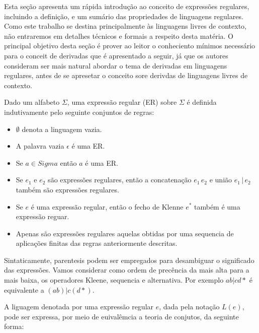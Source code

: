 Esta seção apresenta um rápida introdução ao conceito de expressões regulares, incluindo a definição, e um sumário das propriedades
de linguagens regulares. Como este trabalho se destina principalmente às linguagens livres de contexto, não entraremos em detalhes
técnicos e formais a respeito desta matéria. O principal objetivo desta seção é prover ao leitor o conheciento mínimos necessário para
o conceit de derivadas que é apresentado a seguir, já que os autores consideram ser mais natural abordar o tema de derivadas em linguagens
regulares, antes de se apresetar o conceito sore derivdas de linguagens livres de contexto.


Dado um alfabeto $\Sigma$, uma expressão regular (ER) sobre $\Sigma$ é definida indutivamente pelo seguinte conjuntos de regras:

\begin{itemize}
 \item $\emptyset$  denota a linguagem vazia.
 \item A palavra vazia $\epsilon$ é uma ER.
 \item Se $a\in Sigma$  então $a$ é uma ER.
 \item Se $e_1$ e $e_2$  são expressões regulares, então a concatenação $e_1\,e_2 $ e união $e_1\, |\,e_2$ também são expressões regulares.
 \item Se $e$ é uma expressão regular, então o fecho de Klenne $e^*$ também é uma expressão reguar.
 \item Apenas são expressões regulares aquelas obtidas por uma sequencia de aplicações finitas das regras anteriormente descritas.
\end{itemize}

 Sintaticamente, parentesis podem ser empregados para desambiguar o significado das expressões. Vamos considerar como ordem de precência
 da mais alta para a mais baixa, os operadores Kleene, sequencia e alternativa. Por exemplo $ab|cd*$ é equivalente a $(ab)|c(d*)$.

 A liguagem denotada por uma expressão regular $e$, dada pela notação $L(e)$, pode ser expressa, por meio de euivalêmcia a teoria de conjutos, da seguinte forma:

